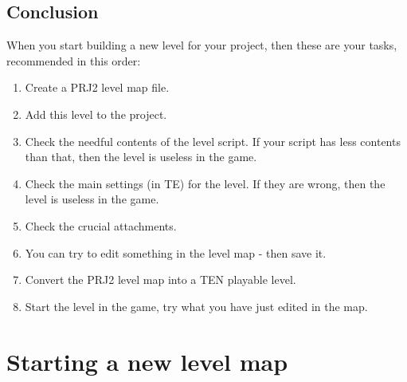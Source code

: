 \section{Conclusion}
When you start building a new level for your project, then these are your tasks, recommended in this order:
\begin{enumerate}
\item Create a PRJ2 level map file.
\item Add this level to the project.
\item Check the needful contents of the level script. If your script has less contents than that, then the level is useless in the game.
\item Check the main settings (in TE) for the level. If they are wrong, then the level is useless in the game.
\item Check the crucial attachments.
\item You can try to edit something in the level map - then save it.
\item Convert the PRJ2 level map into a TEN playable level.
\item Start the level in the game, try what you have just edited in the map.
\end{enumerate} \cite{akyv_tutorial}

\chapter{Starting a new level map}

